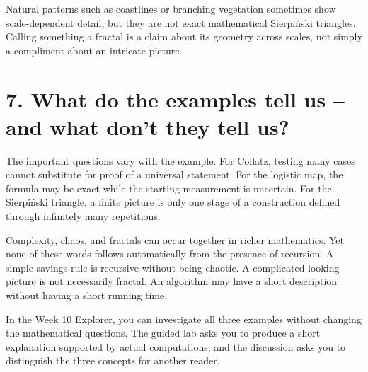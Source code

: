 \documentclass[11pt,letterpaper]{article}
\begin{document}
Natural patterns such as coastlines or branching vegetation sometimes show scale-dependent detail, but they are not exact mathematical Sierpiński triangles. Calling something a fractal is a claim about its geometry across scales, not simply a compliment about an intricate picture.



\clearpage


\section{7. What do the examples tell us -- and what don't they tell us?}


\par{}\par\medskip


The important questions vary with the example. For Collatz, testing many cases cannot substitute for proof of a universal statement. For the logistic map, the formula may be exact while the starting measurement is uncertain. For the Sierpiński triangle, a finite picture is only one stage of a construction defined through infinitely many repetitions.



Complexity, chaos, and fractals can occur together in richer mathematics. Yet none of these words follows automatically from the presence of recursion. A simple savings rule is recursive without being chaotic. A complicated-looking picture is not necessarily fractal. An algorithm may have a short description without having a short running time.



In the Week 10 Explorer, you can investigate all three examples without changing the mathematical questions. The guided lab asks you to produce a short explanation supported by actual computations, and the discussion asks you to distinguish the three concepts for another reader.
\end{document}
